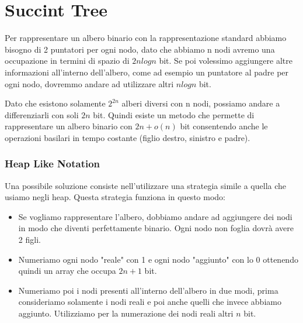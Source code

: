 \documentclass[14pt]{extreport}
\begin{document}
\chapter{Succint Tree}

Per rappresentare un albero binario con la rappresentazione standard abbiamo bisogno di 2 puntatori per ogni nodo, dato che abbiamo n nodi avremo una occupazione in termini di spazio di $2nlogn$ bit. Se poi volessimo aggiungere altre informazioni all'interno dell'albero, come ad esempio un puntatore al padre per ogni nodo, dovremmo andare ad utilizzare altri $nlogn$ bit.

Dato che esistono solamente $2^{2n}$ alberi diversi con n nodi, possiamo andare a differenziarli con soli $2n$ bit.
Quindi esiste un metodo che permette di rappresentare un albero binario con $2n + o(n)$ bit consentendo anche le operazioni basilari in tempo costante (figlio destro, sinistro e padre).


\subsection{Heap Like Notation}

Una possibile soluzione consiste nell'utilizzare una strategia simile a quella che usiamo negli heap.
Questa strategia funziona in questo modo:
\begin{itemize}
    \item Se vogliamo rappresentare l'albero, dobbiamo andare ad aggiungere dei nodi in modo che diventi perfettamente binario. Ogni nodo non foglia dovrà avere 2 figli.
    \item Numeriamo ogni nodo "reale" con 1 e ogni nodo "aggiunto" con lo 0 ottenendo quindi un array che occupa $2n+1$ bit.
    \item Numeriamo poi i nodi presenti all'interno dell'albero in due modi, prima consideriamo solamente i nodi reali e poi anche quelli che invece abbiamo aggiunto. Utilizziamo per la numerazione dei nodi reali altri $n$ bit.
\end{itemize}
\end{document}
